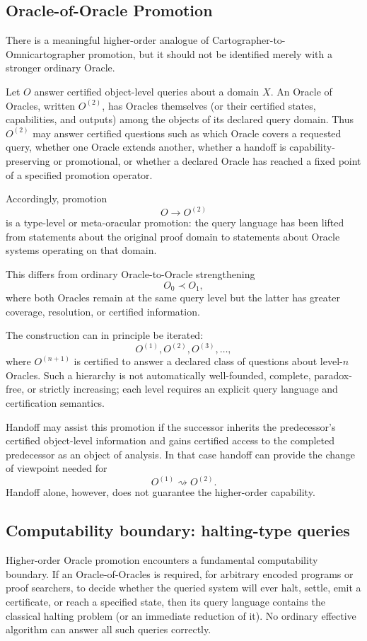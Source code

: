 \documentclass[11pt]{article}
\begin{document}
\subsection{Oracle-of-Oracle Promotion}
There is a meaningful higher-order analogue of Cartographer-to-Omnicartographer promotion, but it should not be identified merely with a stronger ordinary Oracle.

Let $O$ answer certified object-level queries about a domain $X$. An Oracle of Oracles, written $O^{(2)}$, has Oracles themselves (or their certified states, capabilities, and outputs) among the objects of its declared query domain. Thus $O^{(2)}$ may answer certified questions such as which Oracle covers a requested query, whether one Oracle extends another, whether a handoff is capability-preserving or promotional, or whether a declared Oracle has reached a fixed point of a specified promotion operator.

Accordingly, promotion
\[
O\longrightarrow O^{(2)}
\]
is a type-level or meta-oracular promotion: the query language has been lifted from statements about the original proof domain to statements about Oracle systems operating on that domain.

This differs from ordinary Oracle-to-Oracle strengthening
\[
O_0\prec O_1,
\]
where both Oracles remain at the same query level but the latter has greater coverage, resolution, or certified information.

The construction can in principle be iterated:
\[
O^{(1)},O^{(2)},O^{(3)},\ldots,
\]
where $O^{(n+1)}$ is certified to answer a declared class of questions about level-$n$ Oracles. Such a hierarchy is not automatically well-founded, complete, paradox-free, or strictly increasing; each level requires an explicit query language and certification semantics.

Handoff may assist this promotion if the successor inherits the predecessor's certified object-level information and gains certified access to the completed predecessor as an object of analysis. In that case handoff can provide the change of viewpoint needed for
\[
O^{(1)}\rightsquigarrow O^{(2)}.
\]
Handoff alone, however, does not guarantee the higher-order capability.

\subsection{Computability boundary: halting-type queries}
Higher-order Oracle promotion encounters a fundamental computability boundary. If an Oracle-of-Oracles is required, for arbitrary encoded programs or proof searchers, to decide whether the queried system will ever halt, settle, emit a certificate, or reach a specified state, then its query language contains the classical halting problem (or an immediate reduction of it). No ordinary effective algorithm can answer all such queries correctly.
\end{document}
